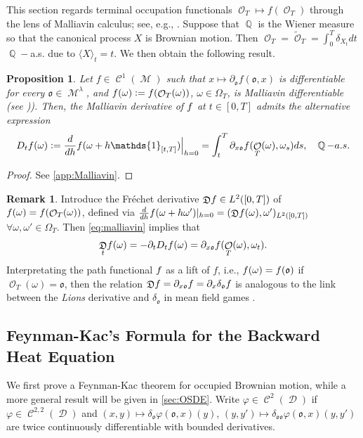 \documentclass[11pt]{article}
\def\mo{\mathfrak{o}}
\theoremstyle{plain}
\newtheorem{proposition}{Proposition}
\theoremstyle{definition}
\newtheorem{remark}{Remark}
\DeclareMathOperator{\Q}{\mathbb{Q}}
\DeclareMathOperator{\calC}{\mathcal{C}}
\DeclareMathOperator{\calD}{\mathcal{D}}
\DeclareMathOperator{\calM}{\mathcal{M}}
\DeclareMathOperator{\calO}{\mathcal{O}}
\DeclareMathOperator{\frakD}{\mathfrak{D}}
\begin{document}
 This section regards terminal occupation functionals $\calO_T \mapsto f(\calO_T)$ through the lens of Malliavin calculus; see, e.g.,  \cite{DiNunno}.  
 Suppose that $\Q$ is the Wiener measure 
 so that the canonical process $X$ is Brownian motion. Then $\calO_T = \tilde{\calO}_T = \int_0^T \delta_{X_t} dt$ $\Q-$a.s. due to  $\langle X \rangle_t = t$.  We  then obtain the following result.

\begin{proposition} \label{prop:Malliavin} Let $f\in \calC^{1}(\calM)$ such that $x\mapsto  \partial_\mo f(\mo,x)$ is differentiable for every $\mo\in \calM^{\lambda}$, and $\textnormal{f}(\omega) :=f(\calO_T(\omega))$, $\omega\in \Omega_T$, is Malliavin differentiable (see \cite{DiNunno})). Then, the Malliavin derivative of $\textnormal{f}$ at $t\in [0,T]$ admits the alternative expression 
\begin{equation}\label{eq:malliavin}
        D_{t}\textnormal{f}(\omega)  := \frac{d}{dh}\textnormal{f}(\omega + h\mathds{1}_{[t,T]})\Big |_{h=0}  = \int_t^T \partial_{x\mo}f(\calO_T(\omega),\omega_s)ds, \quad \Q-a.s. 
    \end{equation}
\end{proposition} 
\begin{proof}
    See \cref{app:Malliavin}. 
\end{proof}

\begin{remark}
Introduce  the Fr\'echet derivative  $\frakD \! \textnormal{f} \in L^2([0,T])$ of  $\textnormal{f}(\omega) =f(\calO_T(\omega))$, defined  via   $\frac{d}{dh}\textnormal{f}(\omega + h\omega') |_{h=0} =  
 (\frakD \! \textnormal{f}(\omega), \omega')_{L^2([0,T])}$  $\forall \omega,\omega' \in \Omega_T$. Then  \eqref{eq:malliavin} implies that 
   $$\frakD_t \! \textnormal{f}(\omega) = - \partial_tD_t\textnormal{f}(\omega) %
   = \partial_{x\mo}f(\calO_T(\omega),\omega_{t}).$$ 
Interpretating the path functional  $\textnormal{f}$ as a lift of $f$, i.e.,   $\textnormal{f}(\omega) = f(\mo)$ if $\calO_T(\omega) = \mo$, 
then the relation 
$\frakD \! \textnormal{f} = \partial_{x\mo}f  = \partial_{x} \delta_{\mo}f $  
is analogous to the link between the \textit{Lions} derivative and  $\delta_{\mo}$ in mean field games  \cite{CardDelLasLio,CarmonaDelarue,LasryLions}.
\end{remark}

\subsection{Feynman-Kac's Formula for the  Backward Heat Equation}\label{sec:FKHeat}%
We first  prove a Feynman-Kac theorem for occupied Brownian motion, while a more general result will be given in  \cref{sec:OSDE}. 
Write $\varphi\in \calC^{2}(\calD)$ if $\varphi \in \calC^{2,2}(\calD)$  and $(x,y)\mapsto \delta_\mo \varphi(\mo,x)(y) $,   $(y,y')\mapsto \delta_{\mo\mo} \varphi(\mo,x)(y,y')$ are twice continuously differentiable with bounded derivatives. 
\end{document}
